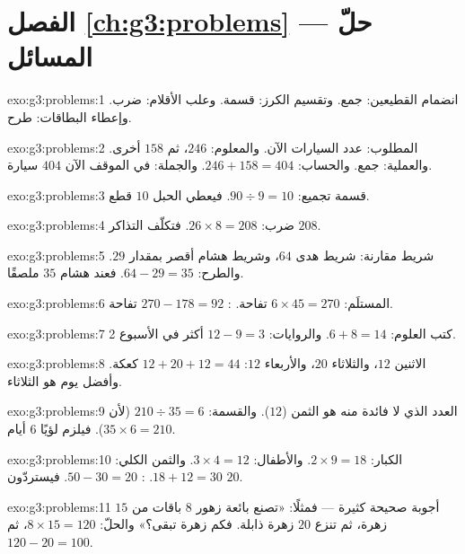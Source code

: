 \section*{الفصل \ref{ch:g3:problems} --- حلّ المسائل}

\begin{solution}{exo:g3:problems:1}
انضمام القطيعين: جمع. وتقسيم الكرز: قسمة. وعلب
الأقلام: ضرب. وإعطاء البطاقات: طرح.
\end{solution}

\begin{solution}{exo:g3:problems:2}
المطلوب: عدد السيارات الآن. والمعلوم: $246$، ثم $158$ أخرى.
والعملية: جمع. والحساب: $246 + 158 = 404$. والجملة: في الموقف
الآن $404$ سيارة.
\end{solution}

\begin{solution}{exo:g3:problems:3}
قسمة تجميع: $90 \div 9 = 10$. فيعطي الحبل $10$ قطع.
\end{solution}

\begin{solution}{exo:g3:problems:4}
ضرب: $26 \times 8 = 208$. فتكلّف التذاكر $208$.
\end{solution}

\begin{solution}{exo:g3:problems:5}
شريط مقارنة: شريط هدى $64$، وشريط هشام أقصر بمقدار $29$.
والطرح: $64 - 29 = 35$. فعند هشام $35$ ملصقًا.
\end{solution}

\begin{solution}{exo:g3:problems:6}
المستلَم: $6 \times 45 = 270$ تفاحة. :
$270 - 178 = 92$ تفاحة.
\end{solution}

\begin{solution}{exo:g3:problems:7}
كتب العلوم: $6 + 8 = 14$. والروايات: $12 - 9 = 3$ أكثر في الأسبوع 2.
\end{solution}

\begin{solution}{exo:g3:problems:8}
الاثنين $12$، والثلاثاء $20$، والأربعاء $12$: 
$12 + 20 + 12 = 44$ كعكة. وأفضل يوم هو الثلاثاء.
\end{solution}

\begin{solution}{exo:g3:problems:9}
العدد الذي لا فائدة منه هو الثمن ($12$). والقسمة:
$210 \div 35 = 6$ (لأن $35 \times 6 = 210$). فيلزم لؤيًا $6$ أيام.
\end{solution}

\begin{solution}{exo:g3:problems:10}
الكبار: $2 \times 9 = 18$. والأطفال: $3 \times 4 = 12$. والثمن الكلي:
$18 + 12 = 30$. : $50 - 30 = 20$. فيستردّون $20$.
\end{solution}

\begin{solution}{exo:g3:problems:11}
أجوبة صحيحة كثيرة --- فمثلًا: «تصنع بائعة زهور $8$ باقات
من $15$ زهرة، ثم تنزع $20$ زهرة ذابلة. فكم زهرة تبقى؟»
والحلّ: $8 \times 15 = 120$، ثم $120 - 20 = 100$.
\end{solution}
